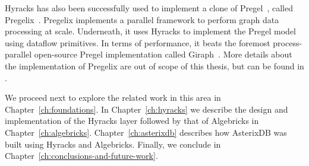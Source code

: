 Hyracks has also been successfully used to implement a clone of Pregel~\cite{Pregel}, called Pregelix~\cite{pregelix}. Pregelix implements a parallel framework to perform graph data processing at scale. Underneath, it uses Hyracks to implement the Pregel model using dataflow primitives. In terms of performance, it beats the foremost process-parallel open-source Pregel implementation called Giraph~\cite{giraph}. More details about the implementation of Pregelix are out of scope of this thesis, but can be found in \cite{pregelix}.

We proceed next to explore the related work in this area in Chapter~\ref{ch:foundations}. In Chapter~\ref{ch:hyracks} we describe the design and implementation of the Hyracks layer followed by that of Algebricks in Chapter~\ref{ch:algebricks}. Chapter~\ref{ch:asterixdb} describes how AsterixDB was built using Hyracks and Algebricks. Finally, we conclude in Chapter~\ref{ch:conclusions-and-future-work}.
